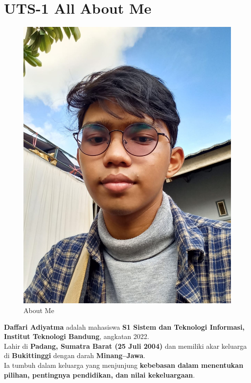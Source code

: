 \documentclass[
  letterpaper,
  DIV=11,
  numbers=noendperiod]{scrreprt}
\author{}
\date{}
\begin{document}
\chapter{\texorpdfstring{\textbf{UTS-1 All About
Me}}{UTS-1 All About Me}}\label{uts-1-all-about-me}

\begin{figure}[H]

{\centering \includegraphics[width=9.5\linewidth,height=\textheight,keepaspectratio]{../images/DAFFARI.jpg}

}

\caption{About Me}

\end{figure}%

\textbf{Daffari Adiyatma} adalah mahasiswa \textbf{S1 Sistem dan
Teknologi Informasi, Institut Teknologi Bandung}, angkatan 2022.\\
Lahir di \textbf{Padang, Sumatra Barat (25 Juli 2004)} dan memiliki akar
keluarga di \textbf{Bukittinggi} dengan darah \textbf{Minang--Jawa}.\\
Ia tumbuh dalam keluarga yang menjunjung \textbf{kebebasan dalam
menentukan pilihan, pentingnya pendidikan, dan nilai kekeluargaan}.
\end{document}
